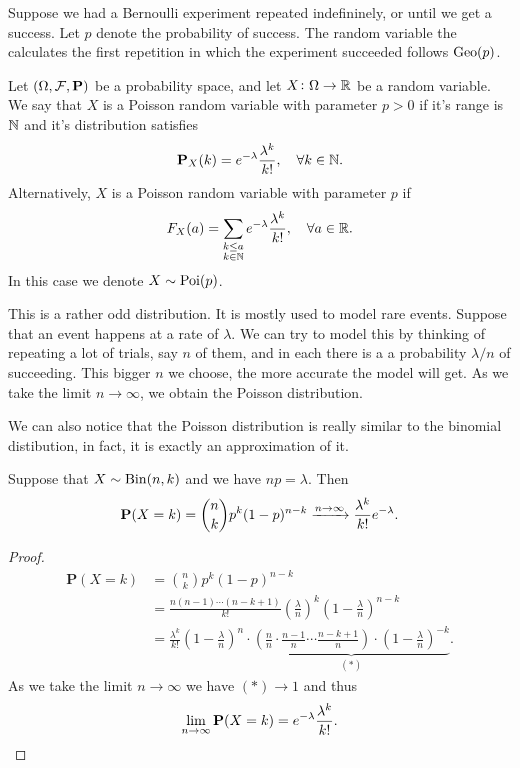 \documentclass[11pt,a4paper]{article}
\begin{document}
  \begin{example}
    Suppose we had a Bernoulli experiment repeated indefininely, or until
    we get a success. Let $p$ denote the probability of success.
    The random variable the calculates the first repetition in which the
    experiment succeeded follows $\operatorname{Geo}(p)$.
  \end{example}

  \begin{definition}
    Let $(\Omega ,\mathcal F, \mathbf{P})$ be a probability space,
    and let $X \colon \Omega \to \mathbb{R}$ be a random variable.
    We say that $X$ is a Poisson random variable with parameter
    $p > 0$ if it's range is $\mathbb{N}$ and it's distribution satisfies
    \[
      \mathbf{P}_X(k) = e^{-\lambda} \frac{\lambda^k}{k!}, \quad 
      \forall k \in \mathbb{N}.
    \]
    Alternatively, $X$ is a Poisson random variable with parameter
    $p$ if
    \[
      F_X(a) = \sum_{\substack{k \le a \\ k \in \mathbb{N}}}
      e^{-\lambda} \frac{\lambda^k}{k!}, \quad \forall a \in \mathbb{R}.
    \]
    In this case we denote $X \sim \operatorname{Poi}(p)$.
  \end{definition}
  
  This is a rather odd distribution. It is mostly used to model rare events.
  Suppose that an event happens at a rate of $\lambda$.
  We can try to model this by thinking of repeating a lot of trials,
  say $n$ of them, and in each there is a a probability $\lambda / n$ of 
  succeeding. This bigger $n$ we choose, the more accurate the model will get.
  As we take the limit $n \to \infty$, we obtain the Poisson distribution.
  
  We can also notice that the Poisson distribution is really similar to
  the binomial distibution, in fact, it is exactly an approximation of it.

  \begin{theorem}
    Suppose that $X \sim \operatorname{Bin}(n,k)$ and we have
    $np = \lambda$. Then
    \[
      \mathbf{P}(X = k) = 
      \binom{n}{k} p^{k} (1-p)^{n-k} \xrightarrow{n\to\infty}
      \frac{\lambda^{k}}{k!} e^{-\lambda}.
    \]
  \end{theorem}
  \begin{proof}
    \begin{align*}
      \mathbf {P}(X = k) &= 
      {\binom{n}{k}}p^{k}(1 - p)^{n - k} \\ &= 
      {\frac{n(n - 1) \cdots (n - k + 1)}{k!}} 
      \left(\frac{\lambda}{n}\right)^k
      \left(1 - {\frac{\lambda}{n}}\right)^{n-k} \\ &= 
      \frac{\lambda^{k}}{k!} \left(1-{\frac{\lambda}{n}}\right)^{n} \cdot
      \underbrace{
      \left( {\frac{n}{n}} \cdot 
      {\frac{n - 1}{n}} \cdots {\frac{n - k + 1}{n}} \right) \cdot 
      \left(1 - {\frac{\lambda}{n}}\right)^{-k}}_{(*)}.
    \end{align*}
    As we take the limit $n \to \infty$ we have $(*) \to 1$ and thus
    \[
      \lim_{n\to\infty}\mathbf{P}(X=k)=e^{-\lambda}{\frac{\lambda^{k}}{k!}}.
    \]
  \end{proof}
\end{document}
